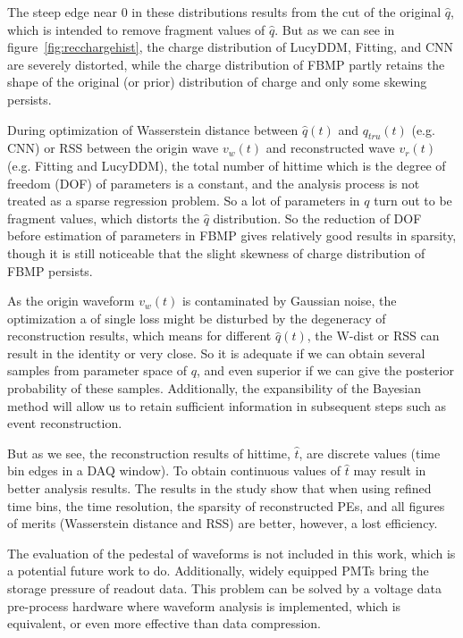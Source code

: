 The steep edge near 0 in these distributions results from the cut of the original $\hat{q}$, which is intended to remove fragment values of $\hat{q}$. But as we can see in figure~\ref{fig:recchargehist}, the charge distribution of LucyDDM, Fitting, and CNN are severely distorted, while the charge distribution of FBMP partly retains the shape of the original (or prior) distribution of charge and only some skewing persists. 

During optimization of Wasserstein distance between $\hat{q}(t)$ and $q_{tru}(t)$ (e.g. CNN) or RSS between the origin wave $v_{w}(t)$ and reconstructed wave $v_{r}(t)$ (e.g. Fitting and LucyDDM), the total number of hittime which is the degree of freedom (DOF) of parameters is a constant, and the analysis process is not treated as a sparse regression problem. So a lot of parameters in $q$ turn out to be fragment values, which distorts the $\hat{q}$ distribution. So the reduction of DOF before estimation of parameters in FBMP gives relatively good results in sparsity, though it is still noticeable that the slight skewness of charge distribution of FBMP persists. 


As the origin waveform $v_{w}(t)$ is contaminated by Gaussian noise, the optimization a of single loss might be disturbed by the degeneracy of reconstruction results, which means for different $\hat{q}(t)$, the W-dist or RSS can result in the identity or very close. So it is adequate if we can obtain several samples from parameter space of $q$, and even superior if we can give the posterior probability of these samples. Additionally, the expansibility of the Bayesian method will allow us to retain sufficient information in subsequent steps such as event reconstruction. 


But as we see, the reconstruction results of hittime, $\hat{t}$, are discrete values (time bin edges in a DAQ window). To obtain continuous values of $\hat{t}$ may result in better analysis results. The results in the study show that when using refined time bins, the time resolution, the sparsity of reconstructed PEs, and all figures of merits (Wasserstein distance and RSS) are better, however, a lost efficiency. 


The evaluation of the pedestal of waveforms is not included in this work, which is a potential future work to do. Additionally, widely equipped PMTs bring the storage pressure of readout data. This problem can be solved by a voltage data pre-process hardware where waveform analysis is implemented, which is equivalent, or even more effective than data compression. 

